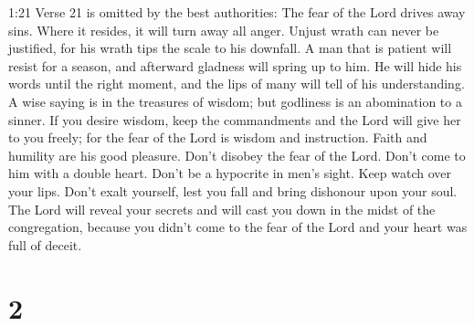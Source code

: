1:21 Verse 21 is omitted by the best authorities: The fear of the Lord
drives away sins. Where it resides, it will turn away all anger.
 Unjust wrath can never be justified, for his wrath tips
the scale to his downfall.  A man that is patient will
resist for a season, and afterward gladness will spring up to him.
 He will hide his words until the right moment, and the
lips of many will tell of his understanding.  A wise saying
is in the treasures of wisdom; but godliness is an abomination to a
sinner.  If you desire wisdom, keep the commandments and
the Lord will give her to you freely;  for the fear of the
Lord is wisdom and instruction. Faith and humility are his good
pleasure.  Don't disobey the fear of the Lord. Don't come
to him with a double heart.  Don't be a hypocrite in men's
sight. Keep watch over your lips.  Don't exalt yourself,
lest you fall and bring dishonour upon your soul. The Lord will reveal
your secrets and will cast you down in the midst of the congregation,
because you didn't come to the fear of the Lord and your heart was full
of deceit.

\hypertarget{section-1}{%
\section{2}\label{section-1}}

